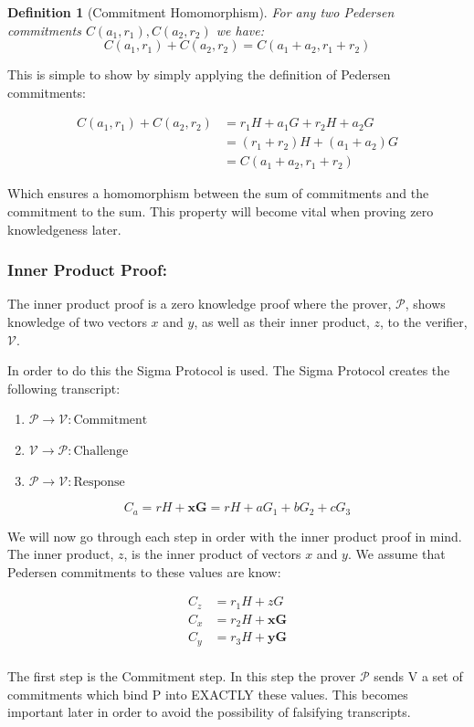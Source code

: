 \documentclass{article}
\newtheorem{definition}{Definition}[section]
\newcommand{\eq}[1]{\begin{equation*}\begin{split}#1\end{split}\end{equation*}}
\newcommand{\verifier}{\mathcal{V}}
\newcommand{\prover}{\mathcal{P}}
\begin{document}
\begin{definition}[Commitment Homomorphism]
For any two Pedersen commitments $C(a_1,r_1), C(a_2,r_2)$ we have:
$$ C(a_1,r_1) + C(a_2,r_2) = C(a_1 + a_2, r_1 + r_2)$$
\end{definition}

This is simple to show by simply applying the definition of Pedersen
commitments: 

\eq{
	C(a_1,r_1) + C(a_2,r_2) &= r_1H + a_1G  + r_2H + a_2G \\
	                        &= (r_1 + r_2)H + (a_1 + a_2)G \\
	                        &= C(a_1+a_2,r_1+r_2)
}

Which ensures a homomorphism between the sum of commitments and the
commitment to the sum. This property will become vital when proving zero
knowledgeness later. 

\subsubsection{Inner Product Proof:}

The inner product proof is a zero knowledge proof where the prover,
$\mathcal{P}$, shows knowledge of two vectors $x$ and $y$, as well as
their inner product, $z$, to the verifier, $\mathcal{V}$. 

In order to do this the Sigma Protocol is used. The Sigma Protocol creates the following transcript: 

\begin{enumerate}
	\item $\prover   \rightarrow \verifier: \text{Commitment}$
	\item $\verifier \rightarrow \prover:   \text{Challenge}$
	\item $\prover   \rightarrow \verifier: \text{Response}$
\end{enumerate}

$$C_a = rH + \mathbf{xG} = rH + aG_1 + bG_2 + cG_3$$

We will now go through each step in order with the inner product proof in
mind. The inner product, $z$, is the inner product of vectors $x$ and
$y$. We assume that Pedersen commitments to these values are know:

\eq{
	C_z &= r_1H + zG \\
	C_x &= r_2H + \mathbf{xG} \\
	C_y &= r_3H + \mathbf{yG} \\
}

The first step is the Commitment step. In this step the prover $\prover$ sends V a set of commitments which bind P into EXACTLY these values. This becomes important later in order to avoid the possibility of falsifying transcripts. 
\end{document}

